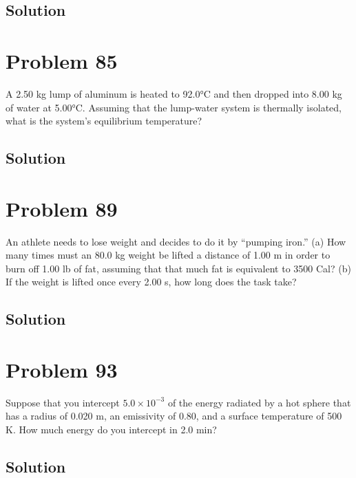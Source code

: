 \documentclass[12pt]{article}
\begin{document}
    \subsection{Solution}

    \pagebreak
    \section{Problem 85}
        A 2.50 kg lump of aluminum is heated to 92.0°C and then dropped into 8.00 kg of water at 5.00°C. 
        Assuming that the lump-water system is thermally isolated, what is the system's equilibrium temperature?

    \subsection{Solution}

    \pagebreak
    \section{Problem 89}
        An athlete needs to lose weight and decides to do it by “pumping iron.” 
        (a) How many times must an 80.0 kg weight be lifted a distance of 1.00 m in order to burn off 1.00 lb of fat, assuming that that much fat is equivalent to 3500 Cal? 
        (b) If the weight is lifted once every 2.00 s, how long does the task take?

    \subsection{Solution}

    \pagebreak
    \section{Problem 93}
        Suppose that you intercept $5.0 \times 10^{-3}$ of the energy radiated by a hot sphere that has a radius of 0.020 m, an emissivity of 0.80, and a surface temperature of 500 K. 
        How much energy do you intercept in 2.0 min?

    \subsection{Solution}

    \pagebreak
\end{document}

